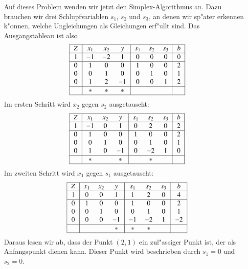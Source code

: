 \begin{beispiel}
Auf dieses Problem wenden wir jetzt den Simplex-Algorithmus an.
Dazu brauchen wir drei Schlupfvariablen $s_1$, $s_2$ und $s_3$, an
denen wir sp"ater erkennen k"onnen, welche Ungleichungen als
Gleichungen erf"ullt sind.
Das Ausgangstableau ist also
\[
\begin{tabular}{|>{$}c<{$}|>{$}c<{$}>{$}c<{$}>{$}c<{$}|>{$}c<{$}>{$}c<{$}>{$}c<{$}|>{$}c<{$}|}
\hline
Z&x_1&x_2& y&s_1&s_2&s_3& b\\
\hline
1& -1& -2& 1&  0&  0&  0& 0\\
\hline
0&  1&  0& 0&  1&  0&  0& 2\\
0&  0&  1& 0&  0&  1&  0& 1\\
0&  1&  2&-1&  0&  0&  1& 2\\
\hline
 &  *&  *& *&   &   &   &  \\
\hline
\end{tabular}
\]
Im ersten Schritt wird $x_2$ gegen $s_2$ ausgetauscht:
\[
\begin{tabular}{|>{$}c<{$}|>{$}c<{$}>{$}c<{$}>{$}c<{$}|>{$}c<{$}>{$}c<{$}>{$}c<{$}|>{$}c<{$}|}
\hline
Z&x_1&x_2& y&s_1&s_2&s_3& b\\
\hline
1& -1&  0& 1&  0&  2&  0& 2\\
\hline
0&  1&  0& 0&  1&  0&  0& 2\\
0&  0&  1& 0&  0&  1&  0& 1\\
0&  1&  0&-1&  0& -2&  1& 0\\
\hline
 &  *&   & *&   &  *&   &  \\
\hline
\end{tabular}
\]
Im zweiten Schritt wird $x_1$ gegen $s_1$ ausgetauscht:
\[
\begin{tabular}{|>{$}c<{$}|>{$}c<{$}>{$}c<{$}>{$}c<{$}|>{$}c<{$}>{$}c<{$}>{$}c<{$}|>{$}c<{$}|}
\hline
Z&x_1&x_2& y&s_1&s_2&s_3& b\\
\hline
1&  0&  0& 1&  1&  2&  0& 4\\
\hline
0&  1&  0& 0&  1&  0&  0& 2\\
0&  0&  1& 0&  0&  1&  0& 1\\
0&  0&  0&-1& -1& -2&  1&-2\\
\hline
 &   &   & *&  *&  *&   &  \\
\hline
\end{tabular}
\]
Daraus lesen wir ab, dass der Punkt $(2,1)$ ein zul"assiger Punkt ist, der
als Anfangspunkt dienen kann.
Dieser Punkt wird beschrieben durch $s_1=0$ und $s_2=0$.


\end{beispiel}
